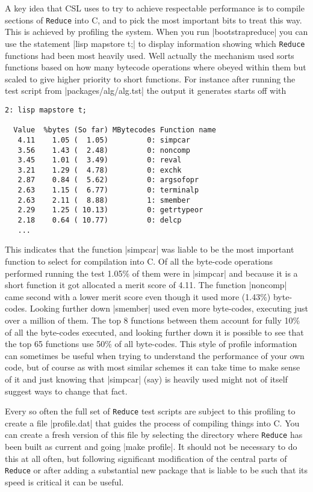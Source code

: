 \documentclass[12pt,twoside,openright]{memoir}
\newcommand{\reduce}{\texttt{Reduce}\xspace}
\begin{document}
A key idea that CSL uses to try to achieve respectable performance is to
compile sections of \reduce into C, and to pick the most important bits to
treat this way. This is achieved by profiling the system. When you run
|bootstrapreduce| you can use the statement |lisp mapstore t;| to
display information showing which \reduce functions had been most heavily
used. Well actually the mechanism used sorts functions based on how many
bytecode operations where obeyed within them but scaled to give higher
priority to short functions. For instance after running the test script
from |packages/alg/alg.tst| the output it generates starts off with
\begin{verbatim}
2: lisp mapstore t;

  Value  %bytes (So far) MBytecodes Function name
   4.11    1.05 (  1.05)         0: simpcar
   3.56    1.43 (  2.48)         0: noncomp
   3.45    1.01 (  3.49)         0: reval
   3.21    1.29 (  4.78)         0: exchk
   2.87    0.84 (  5.62)         0: argsofopr
   2.63    1.15 (  6.77)         0: terminalp
   2.63    2.11 (  8.88)         1: smember
   2.29    1.25 ( 10.13)         0: getrtypeor
   2.18    0.64 ( 10.77)         0: delcp
   ...
\end{verbatim}
This indicates that the function |simpcar| was liable to be the most
important function to select for compilation into C. Of all the byte-code
operations performed running the test 1.05\% of them were in |simpcar|
and because it is a short function it got allocated a merit score of 4.11.
The function |noncomp| came second with a lower merit score even though it
used more (1.43\%) byte-codes. Looking further down |smember| used even more
byte-codes, executing just over a million of them. The top 8 functions
between them account for fully 10\% of all the byte-codes executed, and looking
further down it is possible to see that the top 65 functions use 50\% of
all byte-codes.  This style of profile information can sometimes be useful
when trying to understand the performance of your own code, but of course
as with most similar schemes it can take time to make sense of it and
just knowing that |simpcar| (say) is heavily used might not of itself
suggest ways to change that fact.

Every so often the full set of \reduce test scripts are subject to this
profiling to create a file |profile.dat| that guides the process of compiling
things into C. You can create a fresh version of this file by selecting
the directory where \reduce has been built as current and going
|make profile|. It should not be necessary to do this at all often, but
following significant modification of the central parts of \reduce or
after adding a substantial new package that is liable to be such that its speed
is critical it can be useful.
\end{document}
